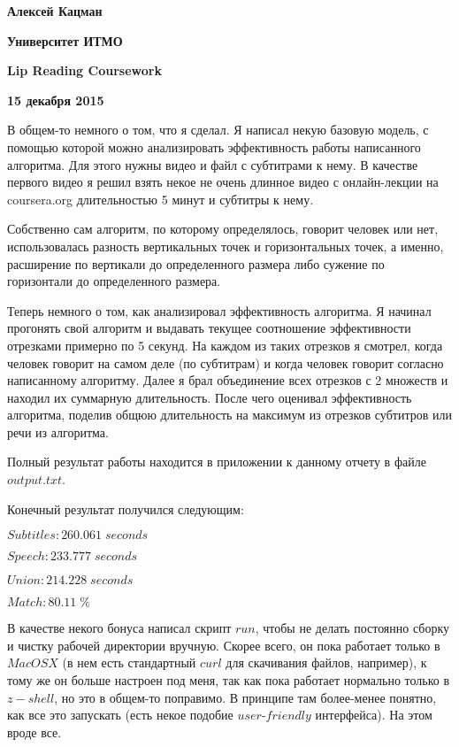 \documentclass[12pt]{article}
\begin{document}
\hfill \textbf{Алексей Кацман}

\hfill \textbf{Университет ИТМО}

\hfill \textbf{Lip Reading Coursework}

\hfill \textbf{15 декабря 2015}

\bigskip

В общем-то немного о том, что я сделал.
Я написал некую базовую модель, с помощью которой можно анализировать эффективность работы написанного алгоритма. Для этого нужны видео и файл с субтитрами к нему. В качестве первого видео я решил взять некое не очень длинное видео с онлайн-лекции на coursera.org длительностью 5 минут и субтитры к нему. 

\bigskip

Собственно сам алгоритм, по которому определялось, говорит человек или нет, использовалась разность вертикальных точек и горизонтальных точек, а именно, расширение по вертикали до определенного размера либо сужение по горизонтали до определенного размера.

\bigskip

Теперь немного о том, как анализировал эффективность алгоритма. Я начинал прогонять свой алгоритм и выдавать текущее соотношение эффективности отрезками примерно по 5 секунд. На каждом из таких отрезков я смотрел, когда человек говорит на самом деле (по субтитрам) и когда человек говорит согласно написанному алгоритму. Далее я брал объединение всех отрезков с 2 множеств и находил их суммарную длительность. После чего оценивал эффективность алгоритма, поделив общюю длительность на максимум из отрезков субтитров или речи из алгоритма.

\bigskip

Полный результат работы находится в приложении к данному отчету в файле $output.txt$.

Конечный результат получился следующим:

\bigskip

$Subtitles: 260.061 \; seconds$

$Speech: 233.777 \; seconds$

$Union: 214.228 \; seconds$

$Match: 80.11 \; \%$

\bigskip

В качестве некого бонуса написал скрипт $run$, чтобы не делать постоянно сборку и чистку рабочей директории вручную. Скорее всего, он пока работает только в $Mac OS X$ (в нем есть стандартный $curl$ для скачивания файлов, например), к тому же он больше настроен под меня, так как пока работает нормально только в $z-shell$, но это в общем-то поправимо. В принципе там более-менее понятно, как все это запускать (есть некое подобие $user$-$friendly$ интерфейса). На этом вроде все.
\end{document}
